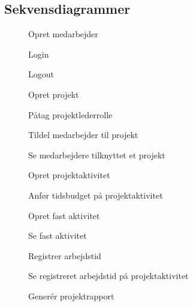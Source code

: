 \subsection{Sekvensdiagrammer}\label{sec:sequence}
\begin{figure}[H]
    \centering
    \caption{Opret medarbejder}\label{fig:sequenceRegisterEmployee}
\end{figure}
\begin{figure}[H]
    \centering
    \caption{Login}\label{fig:sequenceLogin}
\end{figure}
\begin{figure}[H]
    \centering
    \caption{Logout}\label{fig:sequenceLogout}
\end{figure}
\begin{figure}[H]
    \centering
    \caption{Opret projekt}\label{fig:sequenceCreateProject}
\end{figure}
\begin{figure}[H]
    \centering
    \caption{Påtag projektlederrolle}\label{fig:sequenceTakePLRole}
\end{figure}
\begin{figure}[H]
    \centering
    \caption{Tildel medarbejder til projekt}\label{fig:sequenceAssignEmployee}
\end{figure}
\begin{figure}[H]
    \centering
    \caption{Se medarbejdere tilknyttet et projekt}\label{fig:ViewAssignedEmployee}
\end{figure}
\begin{figure}[H]
    \centering
    \caption{Opret projektaktivitet}\label{fig:sequenceCreateProjectActivity}
\end{figure}
\begin{figure}[H]
    \centering
    \caption{Anfør tidsbudget på projektaktivitet}\label{fig:sequenceSetTimeBudget}
\end{figure}
\begin{figure}[H]
    \centering
    \caption{Opret fast aktivitet}\label{fig:sequenceCreateRegularActivity}
\end{figure}
\begin{figure}[H]
    \centering
    \caption{Se fast aktivitet}\label{fig:sequenceViewRegularActivity}
\end{figure}
\begin{figure}[H]
    \centering
    \caption{Registrer arbejdstid}\label{fig:sequenceRegisterWorktime}
\end{figure}
\begin{figure}[H]
    \centering
    \caption{Se registreret arbejdstid på projektaktivitet}\label{fig:sequenceViewWorktime}
\end{figure}
\begin{figure}[H]
    \centering
    \caption{Generér projektrapport}\label{fig:sequenceGenerateProjectReport}
\end{figure}
